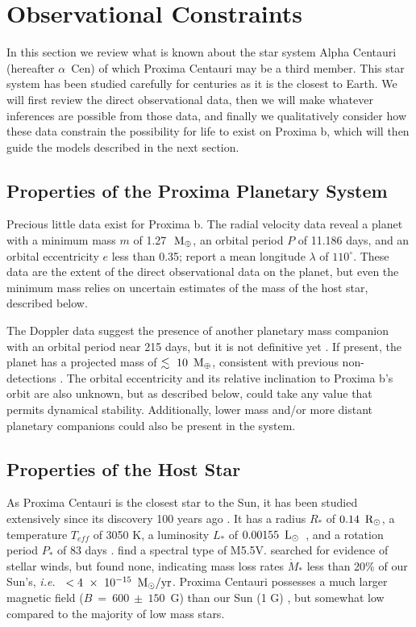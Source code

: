 \documentclass[preprint,12pt]{aastex}
\def\mearth{{\rm\,M_\oplus}}
\def\msun{{\rm\,M_\odot}}
\def\rsun{{\rm\,R_\odot}}
\def\lsun{{\rm\,L_\odot}}
\def\ie{{\it i.e.\ }}
\def\acen{{$\alpha$~Cen}}
\begin{document}
\section{Observational Constraints \label{sec:obs}}

In this section we review what is known about the star system
Alpha Centauri (hereafter \acen) of which Proxima Centauri may be a third
member. This star system has been studied carefully for centuries as
it is the closest to Earth. We will first review the direct
observational data, then we will make whatever inferences are possible
from those data, and finally we qualitatively consider how these data
constrain the possibility for life to exist on Proxima b, which will
then guide the models described in the next section.

\subsection{Properties of the Proxima Planetary System}
\label{sec:obs:planetsys}
Precious little data exist for Proxima b. The radial velocity data
reveal a planet with a minimum mass $m$ of 1.27~$\mearth$, an orbital period $P$
of 11.186 days, and an orbital eccentricity $e$ less than 0.35;
\cite{AngladaEscude16} report a mean longitude $\lambda$ of $110^\circ$. These
data are the extent of the direct observational data on the planet,
but even the minimum mass relies on uncertain estimates of the mass of
the host star, described below.

The Doppler data suggest the presence of another planetary
mass companion with an orbital period near 215 days, but it is not
definitive yet \citep{AngladaEscude16}. If present, the planet has a
projected mass of $\lesssim~10~\mearth$, consistent with previous
non-detections \citep{EndlKurster08,Barnes14,Lurie14}. The orbital
eccentricity and its relative inclination to Proxima b's orbit are also
unknown, but as described below, could take any value that permits
dynamical stability. Additionally, lower mass and/or more distant
planetary companions could also be present in the system.

\subsection{Properties of the Host Star}

\label{sec:obs:star}
As Proxima Centauri is the closest star to the Sun, it has been studied
extensively since its discovery 100 years ago \citep{Innes1915}.  It
has a radius $R_*$ of $0.14~\rsun$, a temperature $T_{eff}$ of 3050 K, a
luminosity $L_*$ of $0.00155~\lsun$~\citep{Boyajian12}, and a rotation
period $P_*$ of 83 days \citep{Benedict98}. \cite{AngladaEscude16} find a spectral type of M5.5V. \cite{Wood01} searched for
evidence of stellar winds, but found none, indicating mass loss rates
$\dot{M}_*$ less than 20\% of our Sun's, \ie
$<4~\times~10^{-15}~\msun/\textrm{yr}$. Proxima Centauri possesses a
much larger magnetic field ($B~=~600~\pm~150$~G) than our Sun (1 G)
\citep{ReinersBasri08}, but somewhat low compared to the majority of
low mass stars. 
\end{document}

